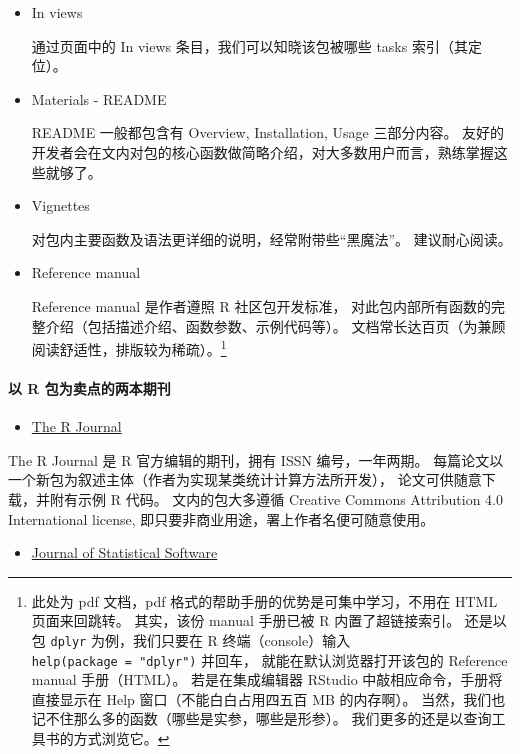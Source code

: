 \documentclass[11pt,hyperref]{ctexart}
\providecommand{\tightlist}{%
  \setlength{\itemsep}{0pt}\setlength{\parskip}{0pt}}
\let\oldparagraph\paragraph
\renewcommand{\paragraph}[1]{\oldparagraph{#1}\mbox{}}
\begin{document}
\begin{itemize}
\item
  In views

  通过页面中的 In views 条目，我们可以知晓该包被哪些 tasks
  索引（其定位）。
\item
  Materials - README

  README 一般都包含有 Overview, Installation, Usage 三部分内容。
  友好的开发者会在文内对包的核心函数做简略介绍，对大多数用户而言，熟练掌握这些就够了。
\item
  Vignettes

  对包内主要函数及语法更详细的说明，经常附带些``黑魔法''。
  建议耐心阅读。
\item
  Reference manual

  Reference manual 是作者遵照 R 社区包开发标准，
  对此包内部所有函数的完整介绍（包括描述介绍、函数参数、示例代码等）。
  文档常长达百页（为兼顾阅读舒适性，排版较为稀疏）。\footnote{此处为 pdf
    文档，pdf 格式的帮助手册的优势是可集中学习，不用在 HTML
    页面来回跳转。 其实，该份 manual 手册已被 R 内置了超链接索引。
    还是以包 \texttt{dplyr} 为例，我们只要在 R 终端（console）输入
    \texttt{help(package\ =\ "dplyr")} 并回车，
    就能在默认浏览器打开该包的 Reference manual 手册（HTML）。
    若是在集成编辑器 RStudio 中敲相应命令，手册将直接显示在 Help
    窗口（不能白白占用四五百 MB 的内存啊）。
    当然，我们也记不住那么多的函数（哪些是实参，哪些是形参）。
    我们更多的还是以查询工具书的方式浏览它。}
\end{itemize}

\hypertarget{ux4ee5-r-ux5305ux4e3aux5356ux70b9ux7684ux4e24ux672cux671fux520a}{%
\paragraph{以 R
包为卖点的两本期刊}\label{ux4ee5-r-ux5305ux4e3aux5356ux70b9ux7684ux4e24ux672cux671fux520a}}

\begin{itemize}
\tightlist
\item
  \href{https://journal.r-project.org/}{The R Journal}
\end{itemize}

The R Journal 是 R 官方编辑的期刊，拥有 ISSN 编号，一年两期。
每篇论文以一个新包为叙述主体（作者为实现某类统计计算方法所开发），
论文可供随意下载，并附有示例 R 代码。 文内的包大多遵循 Creative Commons
Attribution 4.0 International license,
即只要非商业用途，署上作者名便可随意使用。

\begin{itemize}
\tightlist
\item
  \href{https://www.jstatsoft.org/index}{Journal of Statistical
  Software}
\end{itemize}
\end{document}
